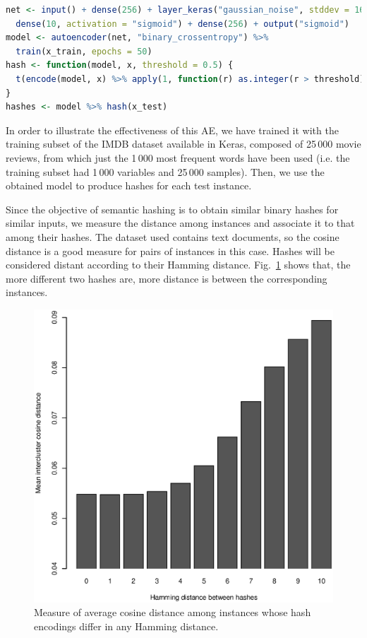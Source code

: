 \documentclass[
	fontsize=11pt, %
	twoside=false, %
	open=any, %
	secnumdepth=1, %
]{kaobook}
\begin{document}
\begin{lstlisting}[language=R]
net <- input() + dense(256) + layer_keras("gaussian_noise", stddev = 16) +
  dense(10, activation = "sigmoid") + dense(256) + output("sigmoid")
model <- autoencoder(net, "binary_crossentropy") %>% 
  train(x_train, epochs = 50)
hash <- function(model, x, threshold = 0.5) {
  t(encode(model, x) %>% apply(1, function(r) as.integer(r > threshold)))
}
hashes <- model %>% hash(x_test)
\end{lstlisting}

In order to illustrate the effectiveness of this AE, we have trained it with the training subset of the IMDB dataset available in Keras, composed of 25\,000 movie reviews, from which just the 1\,000 most frequent words have been used (i.e. the training subset had 1\,000 variables and 25\,000 samples). Then, we use the obtained model to produce hashes for each test instance. 

Since the objective of semantic hashing is to obtain similar binary hashes for similar inputs, we measure the distance among instances and associate it to that among their hashes. The dataset used contains text documents, so the cosine distance is a good measure for pairs of instances in this case. Hashes will be considered distant according to their Hamming distance. Fig.~\ref{fig:hashing} shows that, the more different two hashes are, more distance is between the corresponding instances. %

\begin{figure}[ht]
    \centering
    \includegraphics[width=.75\textwidth]{hashing_intercluster.eps}
    \caption{Measure of average cosine distance among instances whose hash encodings differ in any Hamming distance.}
    \label{fig:hashing}
\end{figure}
\end{document}
